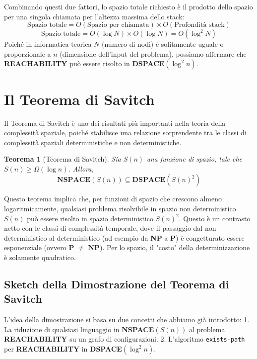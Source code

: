 \documentclass[a4paper, 11pt]{book} %
\newtheorem{theorem}{Teorema}[section]
\theoremstyle{definition}
\begin{document}
Combinando questi due fattori, lo spazio totale richiesto è il prodotto dello spazio per una singola chiamata per l'altezza massima dello stack:
\[ \text{Spazio totale} = O(\text{Spazio per chiamata}) \times O(\text{Profondità stack}) \]
\[ \text{Spazio totale} = O(\log N) \times O(\log N) = O(\log^2 N) \]
Poiché in informatica teorica $N$ (numero di nodi) è solitamente uguale o proporzionale a $n$ (dimensione dell'input del problema), possiamo affermare che \textbf{REACHABILITY} può essere risolto in \textbf{DSPACE}$(\log^2 n)$.

\section{Il Teorema di Savitch}
Il Teorema di Savitch è uno dei risultati più importanti nella teoria della complessità spaziale, poiché stabilisce una relazione sorprendente tra le classi di complessità spaziali deterministiche e non deterministiche.

\begin{theorem}[Teorema di Savitch]
Sia $S(n)$ una funzione di spazio, tale che $S(n) \geq \Omega(\log n)$. Allora,
\[ \mathbf{NSPACE}(S(n)) \subseteq \mathbf{DSPACE}(S(n)^2) \]
\end{theorem}

Questo teorema implica che, per funzioni di spazio che crescono almeno logaritmicamente, qualsiasi problema risolvibile in spazio non deterministico $S(n)$ può essere risolto in spazio deterministico $S(n)^2$. Questo è un contrasto netto con le classi di complessità temporale, dove il passaggio dal non deterministico al deterministico (ad esempio da \textbf{NP} a \textbf{P}) è congetturato essere esponenziale (ovvero \textbf{P} $\ne$ \textbf{NP}). Per lo spazio, il "costo" della determinizzazione è solamente quadratico.

\subsection{Sketch della Dimostrazione del Teorema di Savitch}
L'idea della dimostrazione si basa su due concetti che abbiamo già introdotto:
1.  La riduzione di qualsiasi linguaggio in \textbf{NSPACE}$(S(n))$ al problema \textbf{REACHABILITY} su un grafo di configurazioni.
2.  L'algoritmo \texttt{exists-path} per \textbf{REACHABILITY} in \textbf{DSPACE}$(\log^2 n)$.
\end{document}
